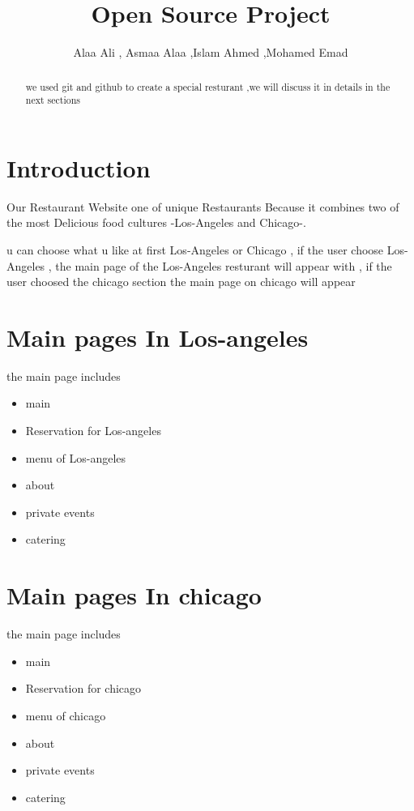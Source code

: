 \documentclass{article}
\begin{document}
\title{Open Source Project}
\author{
Alaa Ali ,
Asmaa Alaa ,Islam Ahmed ,Mohamed Emad }

\maketitle

\begin{abstract}

we used git and github to create a special resturant ,we will discuss it in details in the next sections\end{abstract}

\section{Introduction}

Our Restaurant Website one of unique Restaurants
Because it combines two of the most Delicious food 
cultures -Los-Angeles and Chicago-.

u can choose what u like at first Los-Angeles or Chicago , if the user choose Los-Angeles , the main page of the Los-Angeles resturant will appear with ,
if the user choosed the chicago section the main page on chicago will appear

\section{Main pages In Los-angeles}

the main page includes 

\begin{itemize}
 \item  main
\item Reservation for Los-angeles
\item menu of Los-angeles
\item about
\item private events
\item catering
\end{itemize}


\section{Main pages In chicago}

the main page includes 

\begin{itemize}
 \item  main
\item Reservation for chicago
\item menu of chicago
\item about
\item private events
\item catering
\end{itemize}
\end{document}
